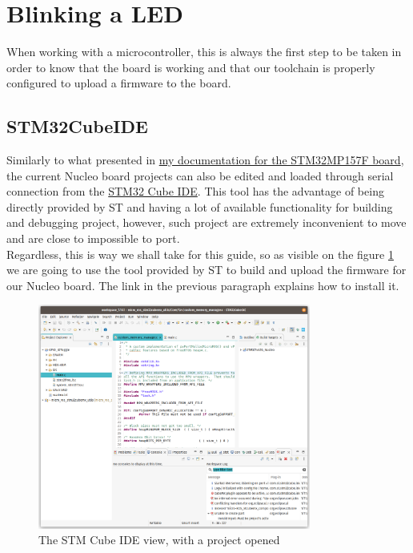 \documentclass[10pt]{article}
\begin{document}
\section{Blinking a LED}
\label{sec:blinking-led}
When working with a microcontroller, this is always the first step to be taken
in order to know that the board is working and that our toolchain is properly
configured to upload a firmware to the board.

\subsection{STM32CubeIDE}
\label{sec:stm32cubeide}
Similarly to what presented in \href{https://gitlab.com/stm32mp157f-dk2/documentation}{my documentation for the STM32MP157F board}, the current Nucleo board projects can also be edited and loaded through serial connection from the \href{https://www.st.com/en/development-tools/stm32cubeide.html}{STM32 Cube IDE}. This tool has the advantage of being directly provided by ST and having a lot of available functionality for building and debugging project, however, such project are extremely inconvenient to move and are close to impossible to port.\\

Regardless, this is way we shall take for this guide, so as visible on the figure \ref{fig:ide} we are going to use the tool provided by ST to build and upload the firmware for our Nucleo board. The link in the previous paragraph explains how to install it.

\begin{figure}[h]
  \centering
  \includegraphics[width=0.8\textwidth]{./img/ide.png}
  \caption{The STM Cube IDE view, with a project opened}
  \label{fig:ide}
\end{figure}
\end{document}
